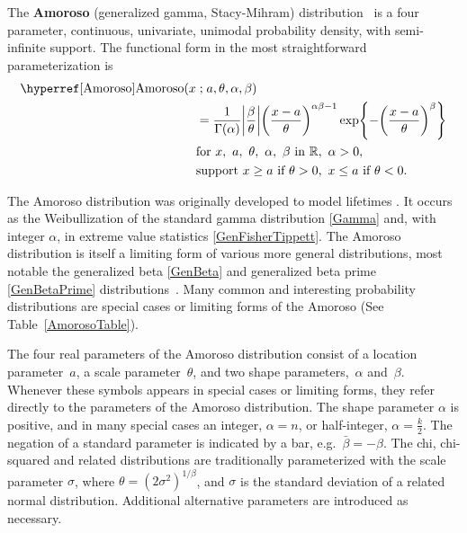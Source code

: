 

\label{sec:Amoroso}
The {\bf Amoroso}  (generalized gamma, Stacy-Mihram) distribution~\cite{Amoroso1925,Johnson1994,Gonzalez2013} is a four parameter,  continuous, univariate, unimodal probability density, with semi-infinite support. The functional form in the most straightforward parameterization is
\begin{align}
\label{Amoroso}  
 \opr{Amoroso}(x&\given  a, \theta, \alpha, \beta) 
\\ \notag&=
\frac{1}{\Gamma(\alpha)} 
\Left|\frac{\beta}{\theta}\Right|
\Left(\frac{x-a}{\theta}\Right)^{\alpha \beta -1}
\exp \Left\{
-  \Left(\frac{x-a}{\theta}\Right)^{\beta}
\Right\}
\checked
\\ \notag
& \text{for } x,\ a,\ \theta,\ \alpha,\ \beta\  \text{in } \mathbb{R}, 
\ \alpha>0, \ 
\\ \notag
& \text{support } x \geq a \ \text{if}\ \theta > 0,  \ x\leq a  \ \text{if}\  \theta < 0 .
\end{align}

The Amoroso distribution was originally developed to model lifetimes \cite{Amoroso1925}. It occurs as the Weibullization of the standard gamma distribution \eqref{Gamma} and, with integer $\alpha$, in extreme value statistics \eqref{GenFisherTippett}. The Amoroso distribution is itself a limiting form of various more general distributions, most notable the generalized beta \eqref{GenBeta} and generalized beta prime \eqref{GenBetaPrime} distributions~\cite{McDonald1984}.
Many common and interesting probability distributions are special cases or limiting forms of the Amoroso  (See Table~\ref{AmorosoTable}). 


The four real parameters of the Amoroso distribution consist of a location parameter~$a$, 
a scale parameter~$\theta$,  and two shape parameters,~$\alpha$ and~$\beta$. Whenever these symbols appears in special cases or limiting forms, they refer directly to the parameters of the Amoroso distribution.
The shape parameter $\alpha$ is positive, and in many special cases an integer, $\alpha=n$, or half-integer, $\alpha=\tfrac{k}{2}$. The negation of a standard parameter is indicated by a bar, e.g.\ $\bar{\beta} = -\beta$. The chi, chi-squared and related distributions are traditionally parameterized with the scale parameter $\sigma$, where $\theta= (2\sigma^2)^{1/{\beta}}$, and $\sigma$ is the standard deviation of a related normal distribution.  Additional alternative parameters are introduced as necessary. 
  


